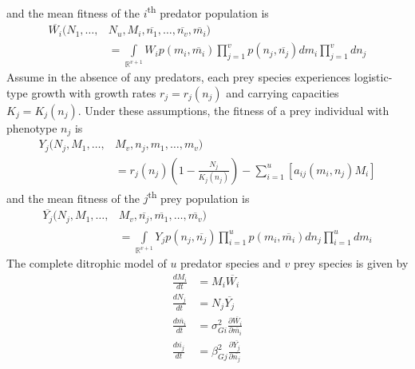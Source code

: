 \documentclass{amsart}
\theoremstyle{definition}
\theoremstyle{remark}
\numberwithin{equation}{section}
\begin{document}
and the mean fitness of the $i$\textsuperscript{th} predator population is
\begin{equation}
	\label{avg_predator_fitness}
	\begin{aligned}
		\overline{W_i}(N_1, \dots, &N_u, M_i, \overline{n_1}, \dots, \overline{n_v}, \overline{m_i}) \\
		&= \int\limits_{\mathbb{R}^{v+1}}^{}W_ip(m_i, \overline{m_i})\prod\limits_{j = 1}^{v}p(n_j, \overline{n_j})dm_i\prod\limits_{j = 1}^{v}dn_j
	\end{aligned}
\end{equation}
Assume in the absence of any predators, each prey species experiences logistic-type growth with growth rates $r_j = r_j(n_j)$ and carrying capacities $K_j = K_j(n_j)$.  Under these assumptions, the fitness of a prey individual with phenotype $n_j$ is
\begin{equation}
	\label{prey_fitness}
	\begin{aligned}
		Y_j(N_j, M_1, \dots, &M_v, n_j, m_1, \dots, m_v) \\
		&= r_j(n_j)\left(1 - \frac{N_j}{K_j(n_j)}\right) - \sum\limits_{i = 1}^{u}\left[a_{ij}(m_i, n_j)M_i\right]
	\end{aligned}
\end{equation}
and the mean fitness of the $j$\textsuperscript{th} prey population is
\begin{equation}
	\label{avg_prey_fitness}
	\begin{aligned}
		\overline{Y_j}(N_j, M_1, \dots, &M_v, \overline{n_j}, \overline{m_1}, \dots, \overline{m_v}) \\
		&= \int\limits_{\mathbb{R}^{v+1}}^{}Y_jp(n_j, \overline{n_j})\prod\limits_{i = 1}^{u}p(m_i, \overline{m_i})dn_j\prod\limits_{i = 1}^{u}dm_i
	\end{aligned}
\end{equation}
The complete ditrophic model of $u$ predator species and $v$ prey species is given by
\begin{subequations}
	\label{general_model}
	\begin{align}
		\label{eq:general_model_a}
		\frac{dM_i}{dt} &= M_i\overline{W_i} \\[5px]
		\label{eq:general_model_b}
		\frac{dN_j}{dt} &= N_j\overline{Y_j} \\[5px]
		\label{eq:general_model_c}
		\frac{d\overline{m_i}}{dt} &= \sigma_{Gi}^2\frac{\partial \overline{W_i}}{\partial \overline{m_i}} \\[5px]
		\label{eq:general_model_d} 
		\frac{d\overline{n_j}}{dt} &= \beta_{Gj}^2\frac{\partial \overline{Y_j}}{\partial \overline{n_j}}
	\end{align}
\end{subequations}
\end{document}
